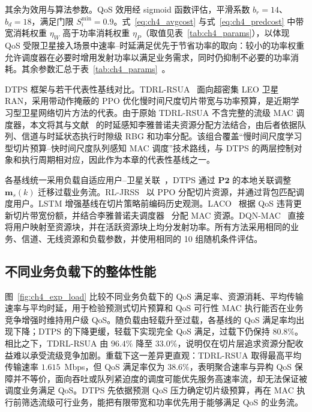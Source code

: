 其余为效用与算法参数。QoS 效用经 sigmoid 函数评估，平滑系数 $b_r=14$、$b_d=18$，满足门限 $S_i^{\min}=0.9$。式~\eqref{eq:ch4_avgcost} 与式~\eqref{eq:ch4_predcost} 中带宽消耗权重 $\eta_W$ 高于功率消耗权重 $\eta_P$（取值见表~\ref{tab:ch4_params}），以体现 QoS 受限卫星接入场景中速率--时延满足优先于节省功率的取向：较小的功率权重允许调度器在必要时增用发射功率以满足业务需求，同时仍抑制不必要的功率消耗。其余参数汇总于表~\ref{tab:ch4_params}~\cite{zhang-JointBeamformingResAlloc-SAGIN-TCOM20,wang-UserSelectionMIMO-TVT21,cybertwin-ModeSelection-LEO-IoTJ22,zhang-RISMIMO-LEO-IoTJ25,hua-GANDRL-ResourceSlicing-JSAC20}。

DTPS 框架与若干代表性基线对比。TDRL-RSUA~\cite{liu-reconfigurableRAN-TCCN25} 面向超密集 LEO 卫星 RAN，采用带动作掩蔽的 PPO 优化慢时间尺度切片带宽与功率预算，是近期学习型卫星网络切片方法的代表。由于原始 TDRL-RSUA 不含完整的流级 MAC 调度器，本文将其与文献~\cite{chai-ResAllocRANSlicing-Lyapunov-TVT25} 的时延感知李雅普诺夫资源分配方法结合，由后者依据队列、信道与时延状态执行时隙级 RBG 和功率分配。该组合覆盖“慢时间尺度学习型切片预算--快时间尺度队列感知 MAC 调度”技术路线，与 DTPS 的两层控制对象和执行周期相对应，因此作为本章的代表性基线之一。

各基线统一采用负载自适应用户--卫星关联~\cite{Nguyen-JointAssocResAlloc-TWC24}，DTPS 通过 $\mathbf{P2}$ 的本地关联调整 $\mathbf m_s(k)$ 迁移过载业务流。RL-JRSS~\cite{wu-LearnSlicing-JCIN21} 以 PPO 分配切片资源，并通过背包匹配调度用户。LSTM 增强基线在切片策略前编码历史观测。LACO~\cite{zaozi-laco-5G-TWC21} 根据 QoS 违背更新切片带宽份额，并结合李雅普诺夫调度器~\cite{chai-ResAllocRANSlicing-Lyapunov-TVT25} 分配 MAC 资源。DQN-MAC~\cite{AlQwider-DQN5GNR-ICC22} 直接将用户映射至资源块，并在活跃资源块上均分发射功率。所有方法采用相同的业务、信道、无线资源和负载参数，并使用相同的 10 组随机条件评估。

\subsection{不同业务负载下的整体性能}
\label{subsec:ch4_exp_load}

图~\ref{fig:ch4_exp_load} 比较不同业务负载下的 QoS 满足率、资源消耗、平均传输速率与平均时延，用于检验预测式切片预算和 QoS 可行性 MAC 执行能否在业务竞争增强时维持用户级 QoS。随负载由轻载升至过载，各基线的 QoS 满足率均出现下降；DTPS 的下降更缓，轻载下实现完全 QoS 满足，过载下仍保持 $80.8\%$。相比之下，TDRL-RSUA 由 $96.4\%$ 降至 $33.0\%$，说明仅在切片层追求资源分配收益难以承受流级竞争加剧。重载下这一差异更直观：TDRL-RSUA 取得最高平均传输速率 $1.615$~Mbps，但 QoS 满足率仅为 $38.6\%$，表明聚合速率与异构 QoS 保障并不等价，面向吞吐或队列紧迫度的调度可能优先服务高速率流，却无法保证被调度业务满足 QoS。DTPS 先依据预测 QoS 压力确定切片级预算，再在 MAC 执行前筛选流级可行业务，能把有限带宽和功率优先用于能够满足 QoS 的业务流。

